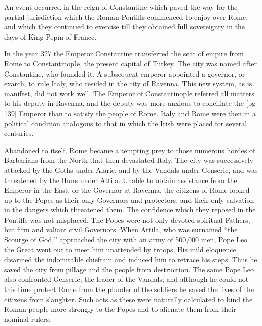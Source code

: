 An event occurred in the reign of Constantine
which paved the way for the partial jurisdiction
which the Roman Pontiffs commenced to enjoy
over Rome, and which they continued to exercise
till they obtained full sovereignty in the days of
King Pepin of France.

In the year 327 the Emperor Constantine transferred
the seat of empire from Rome to Constantinople,
the present capital of Turkey. The city
was named after Constantine, who founded it. A
subsequent emperor appointed a governor, or
exarch, to rule Italy, who resided in the city of
Ravenna. This new system, as is manifest, did
not work well. The Emperor of Constantinople
referred all matters to his deputy in Ravenna, and
the deputy was more anxious to conciliate the
[pg 139]
Emperor than to satisfy the people of Rome.
Italy and Rome were then in a political condition
analogous to that in which the Irish were placed
for several centuries.

Abandoned to itself, Rome became a tempting
prey to those numerous hordes of Barbarians from
the North that then devastated Italy. The city
was successively attacked by the Goths under
Alaric, and by the Vandals under Genseric, and
was threatened by the Huns under Attila. Unable
to obtain assistance from the Emperor in the
East, or the Governor at Ravenna, the citizens of
Rome looked up to the Popes as their only Governors
and protectors, and their only salvation in
the dangers which threatened them. The confidence
which they reposed in the Pontiffs was not
misplaced. The Popes were not only devoted
spiritual Fathers, but firm and valiant civil Governors.
When Attila, who was surnamed “the
Scourge of God,” approached the city with an
army of 500,000 men, Pope Leo the Great went out
to meet him unattended by troops. His mild eloquence
disarmed the indomitable chieftain and induced
him to retrace his steps. Thus he saved
the city from pillage and the people from destruction.
The same Pope Leo also confronted Genseric,
the leader of the Vandals; and although he
could not this time protect Rome from the plunder
of the soldiers he saved the lives of the citizens
from slaughter. Such acts as these were naturally
calculated to bind the Roman people more strongly
to the Popes and to alienate them from their
nominal rulers.

